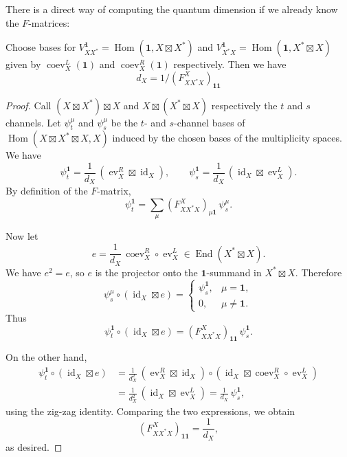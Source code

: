 \documentclass[12pt,letterpaper,reqno]{amsart}
\numberwithin{equation}{section}
\newcommand\bid{{\mathbf 1}}
\DeclareMathOperator{\End}{End}
\DeclareMathOperator{\Hom}{Hom}
\DeclareMathOperator{\id}{id}
\DeclareMathOperator{\ev}{ev}
\DeclareMathOperator{\coev}{coev}
\begin{document}
There is a direct way of computing the 
quantum dimension if we already know the $F$-matrices:

\begin{prop}
Choose bases for $V_{XX^*}^\bid = \Hom(\bid, X \boxtimes X^*)$ and $V_{X^*X}^\bid = \Hom(\bid, X^* \boxtimes X)$
given by $\coev_X^L(\bid)$ and $\coev_X^R(\bid)$ respectively.
Then we have 
\begin{equation}
  d_X = 1 / (F_{X X^* X}^X)_{\bid \bid}
\end{equation}
\end{prop}

\begin{proof}
Call $(X \boxtimes X^*) \boxtimes X$ and $X \boxtimes (X^* \boxtimes X)$
respectively the $t$ and $s$ channels.
Let $\psi_t^\mu$ and $\psi_s^\mu$ be the $t$- and $s$-channel bases of
$\Hom(X\boxtimes X^*\boxtimes X,X)$ induced by the chosen bases of the multiplicity spaces.
We have
\[
\psi_t^{\bid}=\frac1{d_X}\,(\ev_X^R\boxtimes \id_X),
\qquad
\psi_s^{\bid}=\frac1{d_X}\,(\id_X\boxtimes \ev_X^L).
\]
By definition of the $F$-matrix,
\[
\psi_t^{\bid}=\sum_\mu (F_{XX^*X}^X)_{\mu\bid}\,\psi_s^\mu .
\]

Now let
\[
e=\frac1{d_X}\,\coev_X^R\circ \ev_X^L \in \End(X^*\boxtimes X).
\]
We have $e^2=e$, so $e$ is the projector onto the
$\bid$-summand in $X^*\boxtimes X$. Therefore
\[
\psi_s^\mu\circ (\id_X\boxtimes e)=
\begin{cases}
\psi_s^{\bid}, & \mu=\bid,\\
0, & \mu\neq \bid.
\end{cases}
\]
Thus
\[
\psi_t^{\bid}\circ(\id_X\boxtimes e)
=
(F_{XX^*X}^X)_{\bid\bid}\,\psi_s^{\bid}.
\]

On the other hand,
\begin{align*}
\psi_t^{\bid}\circ(\id_X\boxtimes e)
&=
\frac1{d_X^2}\,
(\ev_X^R\boxtimes \id_X)\circ
(\id_X\boxtimes \coev_X^R\circ \ev_X^L) \\
&=
\frac1{d_X^2}\,
(\id_X\boxtimes \ev_X^L)
=
\frac1{d_X}\,\psi_s^{\bid},
\end{align*}
using the zig-zag identity.
Comparing the two expressions, we obtain
\[
(F_{XX^*X}^X)_{\bid\bid}=\frac1{d_X},
\]
as desired.
\end{proof}
\end{document}
